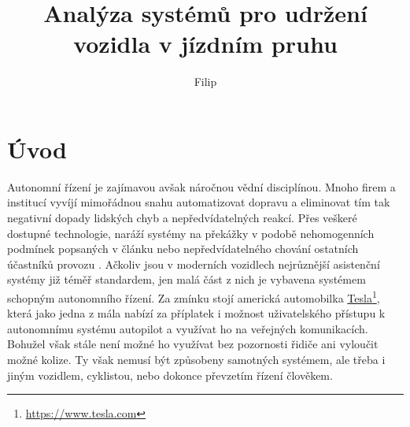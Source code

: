 \documentclass[czech, bc, kky, he, iso690numb]{fasthesis}
\title{Analýza systémů pro udržení vozidla v jízdním pruhu}
\author{Filip}{Jašek}{}{}
\begin{document}
    \frontpages[tm] %
    \tableofcontents
    \makeatletter%
    \ifx\FASThesis@style\c@fullcolor%
    \else%
    \fi%
    \makeatother%
	\chapter{Úvod}
		Autonomní řízení je zajímavou avšak náročnou vědní disciplínou. Mnoho firem a institucí vyvíjí mimořádnou snahu automatizovat dopravu a eliminovat tím tak negativní dopady lidských chyb a nepředvídatelných reakcí. Přes veškeré dostupné technologie, naráží systémy na překážky v podobě nehomogenních podmínek popsaných v článku \cite{VIOLET} nebo nepředvídatelného chování ostatních účastníků provozu \cite{AV_crashes_involved_vulnerable, AV_vs_CV_crashes}. Ačkoliv jsou v moderních vozidlech nejrůznější asistenční systémy již téměř standardem, jen malá část z nich je vybavena systémem schopným autonomního řízení. Za zmínku stojí americká automobilka \href{https://www.tesla.com}{Tesla}\footnote{\href{https://www.tesla.com}{https://www.tesla.com}}, která jako jedna z mála nabízí za příplatek i možnost uživatelského přístupu k autonomnímu systému autopilot a využívat ho na veřejných komunikacích. Bohužel však stále není možné ho využívat bez pozornosti řidiče ani vyloučit možné kolize. Ty však nemusí být způsobeny samotných systémem, ale třeba i jiným vozidlem, cyklistou, nebo dokonce převzetím řízení člověkem.
		
\end{document}
